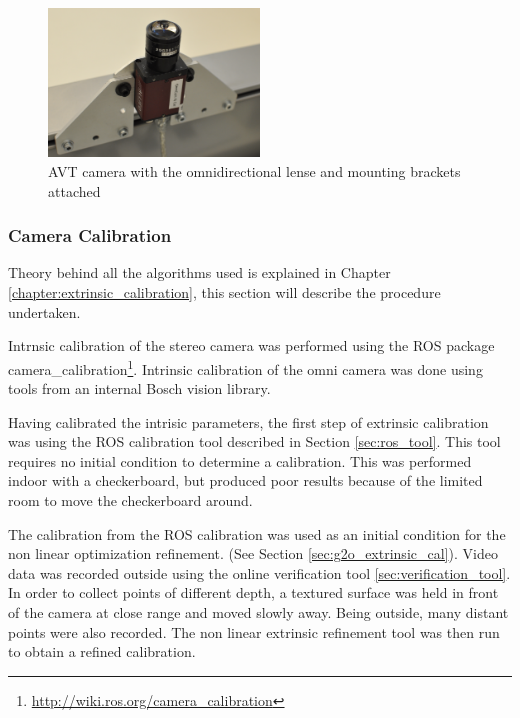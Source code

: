 
\begin{figure}[h]
  \centering
    \includegraphics[width=0.5\textwidth]{chapters/images/omni_cam_image}
  \caption{AVT camera with the omnidirectional lense and mounting brackets attached}
\end{figure}

\subsubsection{Camera Calibration}
\label{subsubsec:actual_calibation}

Theory behind all the algorithms used is explained in Chapter \ref{chapter:extrinsic_calibration}, this section will describe the procedure undertaken.  

Intrnsic calibration of the stereo camera was performed using the ROS package camera\_calibration\footnote{\url{http://wiki.ros.org/camera_calibration}}.  Intrinsic calibration of the omni camera was done using tools from an internal Bosch vision library.

Having calibrated the intrisic parameters, the first step of extrinsic calibration was using the ROS calibration tool described in Section \ref{sec:ros_tool}.  This tool requires no initial condition to determine a calibration.  This was performed indoor with a checkerboard, but produced poor results because of the limited room to move the checkerboard around.

The calibration from the ROS calibration was used as an initial condition for the non linear optimization refinement. (See Section \ref{sec:g2o_extrinsic_cal}).  Video data was recorded outside using the online verification tool \ref{sec:verification_tool}.  In order to collect points of different depth, a textured surface was held in front of the camera at close range and moved slowly away.  Being outside, many distant points were also recorded.  The non linear extrinsic refinement tool was then run to obtain a refined calibration.   

